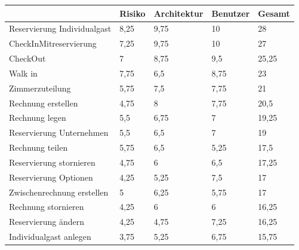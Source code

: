 \documentclass[a4paper,12pt,twoside]{scrreprt}
\begin{document}
        \begin{longtable}{|l|l|l|l|l|}
            \hline
                                         & Risiko & Architektur & Benutzer & Gesamt \\ \hline
            Reservierung Individualgast  & 8,25              & 9,75                   & 10                  & 28     \\
            CheckInMitreservierung       & 7,25              & 9,75                   & 10                  & 27     \\
            CheckOut                     & 7                 & 8,75                   & 9,5                 & 25,25  \\
            Walk in                      & 7,75              & 6,5                    & 8,75                & 23     \\
            Zimmerzuteilung              & 5,75              & 7,5                    & 7,75                & 21     \\
            Rechnung erstellen           & 4,75              & 8                      & 7,75                & 20,5   \\
            Rechnung legen               & 5,5               & 6,75                   & 7                   & 19,25  \\
            Reservierung Unternehmen     & 5,5               & 6,5                    & 7                   & 19     \\
            Rechnung teilen              & 5,75              & 6,5                    & 5,25                & 17,5   \\
            Reservierung stornieren      & 4,75              & 6                      & 6,5                 & 17,25  \\
            Reservierung Optionen        & 4,25              & 5,25                   & 7,5                 & 17     \\
            Zwischenrechnung erstellen   & 5                 & 6,25                   & 5,75                & 17     \\
            Rechnung stornieren          & 4,25              & 6                      & 6                   & 16,25  \\
            Reservierung ändern          & 4,25              & 4,75                   & 7,25                & 16,25  \\
            Individualgast anlegen       & 3,75              & 5,25                   & 6,75                & 15,75  \\

\end{longtable}
\end{document}

